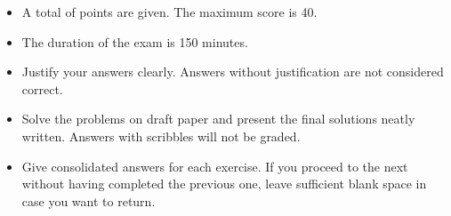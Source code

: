 \documentclass[10pt,english,solution]{exam-uoc}
\begin{document}
\begin{information}
    \begin{itemize}
        \item A total of \gettotalpoints{} points are given. The maximum score is 40.
        \item The duration of the exam is 150 minutes.
        \item Justify your answers clearly. Answers without justification
              are not considered correct.
        \item Solve the problems on draft paper and present the final solutions 
              neatly written. Answers with scribbles will not be graded.
        \item Give consolidated answers for each exercise. 
              If you proceed to the next without having completed the previous one, 
              leave sufficient blank space in case you want to return.
    \end{itemize}
\end{information}
\end{document}
